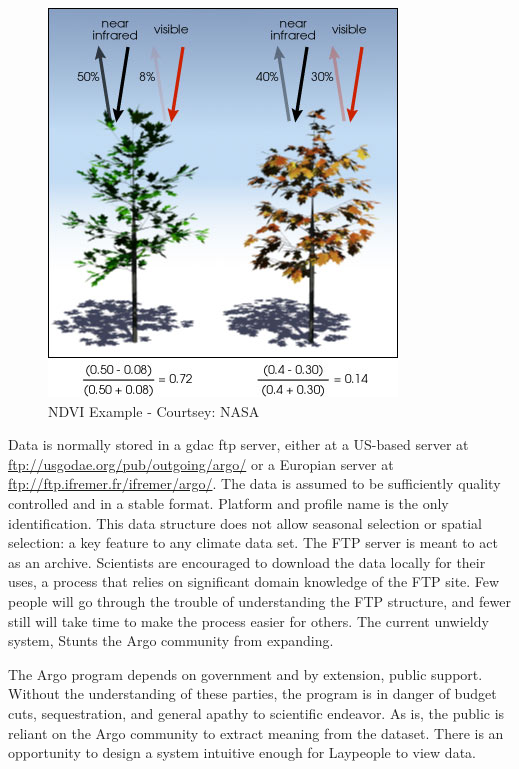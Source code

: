     \begin{figure}[H]
            \centering
            \includegraphics[width=1.0\linewidth]{figures/ch3/ndvi-example.png}
            \caption{\label{fig:level_list_screen} NDVI Example - Courtsey: NASA}
    \end{figure}

Data is normally stored in a \gls{gdac} \gls{ftp} server, either at a US-based server at \url{ftp://usgodae.org/pub/outgoing/argo/} or a Europian server at \url{ftp://ftp.ifremer.fr/ifremer/argo/}. The data is assumed to be sufficiently quality controlled and in a stable format. Platform and profile name is the only identification. This data structure does not allow seasonal selection or spatial selection: a key feature to any climate data set. The FTP server is meant to act as an archive. Scientists are encouraged to download the data locally for their uses, a process that relies on significant domain knowledge of the FTP site. Few people will go through the trouble of understanding the FTP structure, and fewer still will take time to make the process easier for others. The current unwieldy system, Stunts the Argo community from expanding.

The Argo program depends on government and by extension, public support. Without the understanding of these parties, the program is in danger of budget cuts, sequestration, and general apathy to scientific endeavor. As is, the public is reliant on the Argo community to extract meaning from the dataset. There is an opportunity to design a system intuitive enough for Laypeople to view data. 

